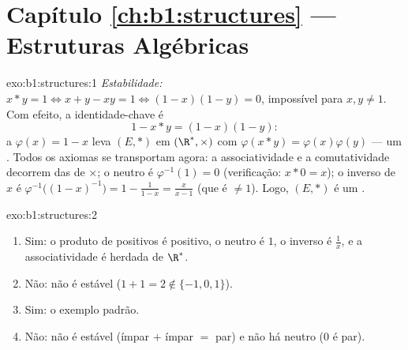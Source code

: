 \section*{Capítulo \ref{ch:b1:structures} --- Estruturas Algébricas}

\begin{solution}{exo:b1:structures:1}
\emph{Estabilidade:} $x * y = 1 \iff x + y - xy = 1 \iff (1-x)(1-y) = 0$,
impossível para $x, y \neq 1$. Com efeito, a identidade-chave é
\[
1 - x * y = (1 - x)(1 - y):
\]
a  $\varphi(x) = 1 - x$ leva $(E, *)$ em $(\R^*, \times)$ com
$\varphi(x * y) = \varphi(x)\varphi(y)$ --- um  . Todos os
axiomas se transportam agora: a associatividade e a comutatividade
decorrem das de $\times$; o neutro é $\varphi^{-1}(1) = 0$ (verificação: $x *
0 = x$); o inverso de $x$ é $\varphi^{-1}\bigl((1-x)^{-1}\bigr) =
1 - \frac{1}{1-x} = \frac{x}{x - 1}$ (que é $\neq 1$). Logo, $(E, *)$
é um .
\end{solution}

\begin{solution}{exo:b1:structures:2}
\begin{enumerate}
  \item Sim: o produto de positivos é positivo, o neutro é $1$, o inverso
        é $\frac 1x$, e a associatividade é herdada de $\R^*$.
  \item Não: não é estável ($1 + 1 = 2 \notin \{-1,0,1\}$).
  \item Sim: o exemplo padrão.
  \item Não: não é estável (ímpar $+$ ímpar $=$ par) e não há neutro ($0$
        é par).
\end{enumerate}
\end{solution}

